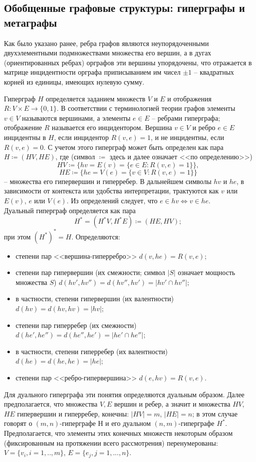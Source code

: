 \subsection{Обобщенные графовые структуры: гиперграфы и метаграфы}

Как было указано ранее, ребра графов являются неупорядоченными двухэлементными подмножествами множества его вершин, а в дугах (ориентированных ребрах) орграфов эти вершины упорядочены, что отражается в матрице инцидентности орграфа приписыванием им чисел $\pm 1$ -- квадратных корней из единицы, имеющих нулевую сумму. 

Гиперграф $H$ определяется заданием множеств $V$ и $E$ и отображения $R: V \times E \to \{0,1\} $. В соответствии с терминологией теории графов элементы $v \in V$ называются вершинами, а элементы $e \in E$ -- ребрами гиперграфа; отображение $R$ называется его инцидентором. Вершина $v \in V$ и ребро $e \in E$ инцидентны в $H$, если инцидентор $R(v,e)=1$, и не инцидентны, если $R(v,e)=0$. С учетом этого гиперграф может быть определен как пара $H \coloneqq (HV,HE)$, где (символ $\coloneqq$ здесь и далее означает <<по определению>>)
$$HV \coloneqq \{hv=E(v)=\{e \in E:R(v,e)=1\}\},$$
$$HE \coloneqq \{he=V(e)=\{v\in V:R(v,e)=1\}\}$$ -- 
множества его гипервершин и гиперребер. В дальнейшем символы $hv$ и $he$, в зависимости от контекста или удобства интерпретации, трактуются как $v$ или $E(v)$, $e$ или $V(e)$. Из определений следует, что $e\in hv \Leftrightarrow v \in he$. 
\\Дуальный гиперграф определяется как пара 
$$H^*=(H^*V,H^*E)\coloneqq(HE,HV);$$ 
при этом $(H^*)^*=H$.
Определяются:
\begin{itemize}
	\item степени пар <<вершина-гиперребро>> $d(v,he)=R(v,e);$
	\item степени пар гипервершин (их смежности; символ $|S|$ означает мощность множества $S$) $d(hv',hv'')=d(hv'',hv')=|hv'\cap hv''|;$
	\item в частности, степени гипервершин (их валентности) $d(hv)=d(hv,hv)=|hv|$;
	\item степени пар гиперребер (их смежности) $d(he',he'')=d(he'',he')=|he'\cap he''|$;
	\item в частности, степени гиперребер (их валентности) $d(he)=d(he,he)=|he|;$
	\item степени пар <<ребро-гипервершина>> $d(e,hv)=R(v,e).$
\end{itemize}

Для дуального гиперграфа эти понятия определяются дуальным образом. Далее предполагается, что множества $V, E$ вершин и ребер, а значит и множества $HV$, $HE$ гипервершин и гиперребер, конечны: $|HV|=m$, $|HE|=n$; в этом случае говорят о $(m,n)$-гиперграфе $Н$ и его дуальном $(n,m)$-гиперграфе $H^*$. Предполагается, что элементы этих конечных множеств некоторым образом (фиксированным на протяжении всего рассмотрения) перенумерованы: $V=\{v_i,i=1,..,m\}$, $E=\{e_j, j=1,...,n\}$. 

